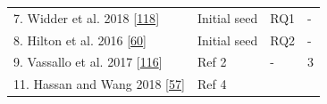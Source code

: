 \documentclass[]{book}
\begin{document}
\begin{longtable}[]{@{}llll@{}}
\begin{minipage}[t]{0.56\columnwidth}\raggedright\strut
7. Widder et al. 2018
{[}\protect\hyperlink{ref-widder2018m}{118}{]}\strut
\end{minipage} & \begin{minipage}[t]{0.18\columnwidth}\raggedright\strut
Initial seed\strut
\end{minipage} & \begin{minipage}[t]{0.08\columnwidth}\raggedright\strut
RQ1\strut
\end{minipage} & \begin{minipage}[t]{0.06\columnwidth}\raggedright\strut
-\strut
\end{minipage}\tabularnewline
\begin{minipage}[t]{0.56\columnwidth}\raggedright\strut
8. Hilton et al. 2016
{[}\protect\hyperlink{ref-hilton2016usage}{60}{]}\strut
\end{minipage} & \begin{minipage}[t]{0.18\columnwidth}\raggedright\strut
Initial seed\strut
\end{minipage} & \begin{minipage}[t]{0.08\columnwidth}\raggedright\strut
RQ2\strut
\end{minipage} & \begin{minipage}[t]{0.06\columnwidth}\raggedright\strut
-\strut
\end{minipage}\tabularnewline
\begin{minipage}[t]{0.56\columnwidth}\raggedright\strut
9. Vassallo et al. 2017
{[}\protect\hyperlink{ref-vassallo2017tale}{116}{]}\strut
\end{minipage} & \begin{minipage}[t]{0.18\columnwidth}\raggedright\strut
Ref 2\strut
\end{minipage} & \begin{minipage}[t]{0.08\columnwidth}\raggedright\strut
-\strut
\end{minipage} & \begin{minipage}[t]{0.06\columnwidth}\raggedright\strut
3\strut
\end{minipage}\tabularnewline
\begin{minipage}[t]{0.56\columnwidth}\raggedright\strut
11. Hassan and Wang 2018
{[}\protect\hyperlink{ref-hassan2018hirebuild}{57}{]}\strut
\end{minipage} & \begin{minipage}[t]{0.18\columnwidth}\raggedright\strut
Ref 4\strut
\end{minipage} & \begin{minipage}[t]{0.08\columnwidth}\raggedright\strut

\end{minipage}
\end{longtable}
\end{document}
